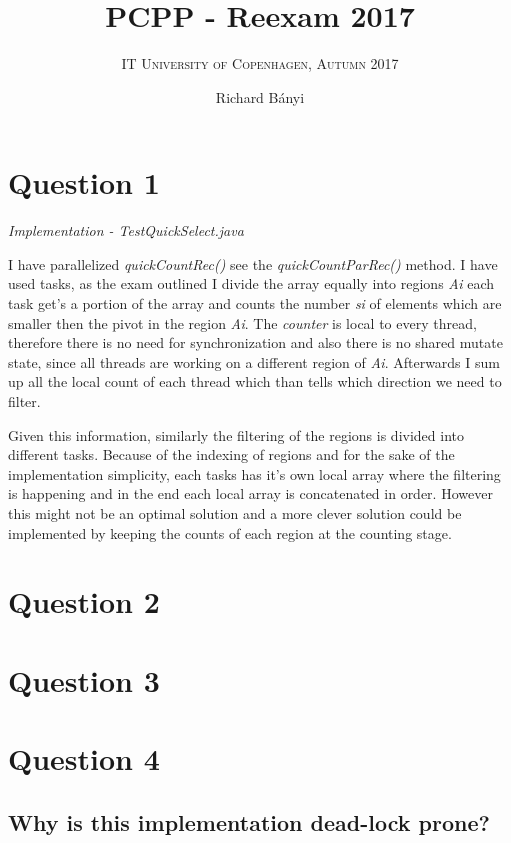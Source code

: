 \documentclass[format=acmsmall, review=false, screen=true]{acmart}
\author{Richard Bányi}
\title{\textsc{PCPP} - Reexam 2017}
\subtitle{\textsc{IT University of Copenhagen, Autumn 2017}}
\begin{document}
\maketitle 

\section{Question 1}

\textit{Implementation - TestQuickSelect.java}

I have parallelized \textit{quickCountRec()}  see the \textit{quickCountParRec()} method.
I have used tasks, as the exam outlined I divide the array equally into regions \textit{Ai} each task get's a portion of the array and counts the number \textit{si} of elements which are smaller then the pivot in the region \textit{Ai}. The \textit{counter} is local to every thread, therefore there is no need for synchronization and also there is no shared mutate state, since all threads are working on a different region of \textit{Ai}. Afterwards I sum up all the local count of each thread which than tells which direction we need to filter.

Given this information, similarly the filtering of the regions is divided into different tasks. Because of the indexing of regions and for the sake of the implementation simplicity, each tasks has it's own local array where the filtering is happening and in the end each local array is concatenated in order. However this might not be an optimal solution and a more clever solution could be implemented by keeping the counts of each region at the counting stage.



\section{Question 2}

\section{Question 3}



\section{Question 4}

\subsection{Why is this implementation dead-lock prone?}
\end{document}
